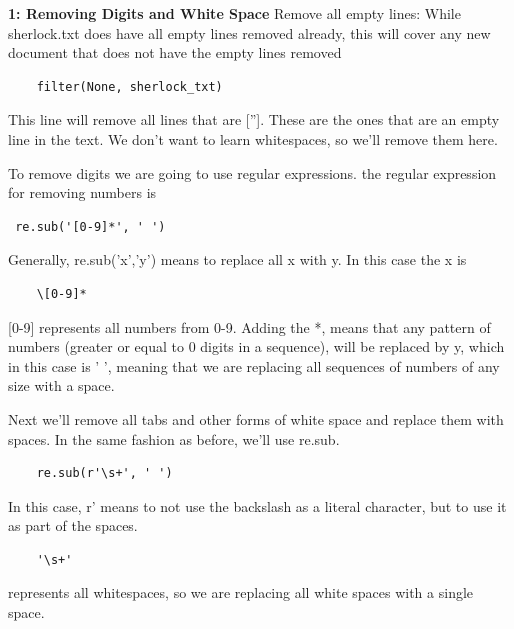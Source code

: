 \documentclass{article}
\begin{document}
\textbf{1: Removing Digits and White Space}
Remove all empty lines:
While sherlock.txt does have all empty lines removed already, this will cover any new document that does not have the empty lines removed
\begin{verbatim}
    filter(None, sherlock_txt)
\end{verbatim}
This line will remove all lines that are ['']. These are the ones that are an empty line in the text. We don't want to learn whitespaces, so we'll remove them here. 

To remove digits we are going to use regular expressions. the regular expression for removing numbers is \begin{verbatim} re.sub('[0-9]*', ' ')
\end{verbatim}
Generally, re.sub('x','y') means to replace all x with y. In this case the x is \begin{verbatim}
    \[0-9]*
\end{verbatim}
[0-9] represents all numbers from 0-9. Adding the *, means that any pattern of numbers (greater or equal to 0 digits in a sequence), will be replaced by y, which in this case is ' ', meaning that we are replacing all sequences of numbers of any size with a space. 


Next we'll remove all tabs and other forms of white space and replace them with spaces. In the same fashion as before, we'll use re.sub.
\begin{verbatim}
    re.sub(r'\s+', ' ')
\end{verbatim}
 In this case, r' means to not use the backslash as a literal character, but to use it as part of the spaces. 
 \begin{verbatim}
    '\s+'
 \end{verbatim}
 represents all whitespaces, so we are replacing all white spaces with a single space.
 
\end{document}
